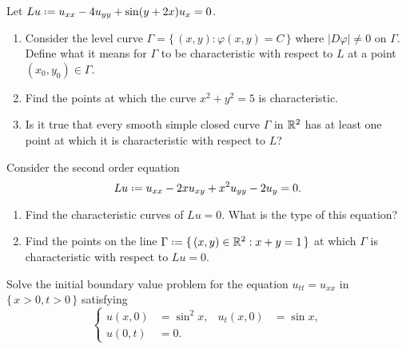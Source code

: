 \begin{problem}
  Let \(Lu\defeq u_{xx}-4u_{yy}+\sin(y+2x)u_{x}=0\).
  \begin{enumerate}[label=(\alph*),noitemsep]
  \item Consider the level curve \(\Gamma=\{\,(x,y):\varphi(x,y)=C\,\}\)
    where \(|D\varphi|\neq 0\) on \(\Gamma\). Define what it means for
    \(\Gamma\) to be characteristic with respect to \(L\) at a point
    \((x_0,y_0)\in\Gamma\).
  \item Find the points at which the curve \(x^2+y^2=5\) is
    characteristic.
  \item Is it true that every smooth simple closed curve \(\Gamma\) in
    \(\mathbb{R}^2\) has at least one point at which it is characteristic with
    respect to \(L\)?
  \end{enumerate}
\end{problem}
\begin{solution*}
\end{solution*}

\begin{problem}
  Consider the second order equation
  \[
    Lu\defeq u_{xx}-2xu_{xy}+x^2u_{yy}-2u_y=0.
  \]
  \begin{enumerate}[label=(\alph*),noitemsep]
  \item Find the characteristic curves of \(Lu=0\). What is the type of
    this equation?
  \item Find the points on the line
    \(\Gamma\defeq\{\,(x,y)\in\bbR^2:x+y=1\,\}\) at which \(\Gamma\) is
    characteristic with respect to \(Lu=0\).
  \end{enumerate}
\end{problem}
\begin{solution*}
\end{solution*}

\begin{problem}
  Solve the initial boundary value problem for the equation
  \(u_{tt}=u_{xx}\) in \(\{\,x>0,t>0\,\}\) satisfying
    \[
     \left\{
       \begin{aligned}
         u(x,0)&=\sin^2x,&u_t(x,0)&=\sin x,\\
         u(0,t)&=0.
      \end{aligned}
    \right.
  \]
\end{problem}
\begin{solution*}
\end{solution*}

